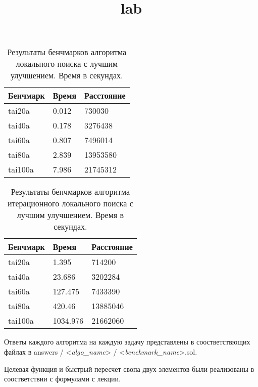 \documentclass{article}
\title{lab}
\author{}
\date{}
\begin{document}
\setlength{\parindent}{35pt}
\setlength{\footnotemargin}{5pt}
\sloppy
\frenchspacing %



\begin{table}[!h]
    \begin{center}
        \begin{tabular}{ | m{4.2em} | m{5em} | m{5em} |}
            \hline
            Бенчмарк & Время & Расстояние \\
            \hline
            tai20a   & 0.012 & 730030     \\
            \hline
            tai40a   & 0.178 & 3276438    \\
            \hline
            tai60a   & 0.807 & 7496014    \\
            \hline
            tai80a   & 2.839 & 13953580   \\
            \hline
            tai100a  & 7.986 & 21745312   \\
            \hline
        \end{tabular}
        \caption{Результаты бенчмарков алгоритма локального поиска с лучшим улучшением. Время в секундах.}
    \end{center}
\end{table}

\begin{table}[!h]
    \begin{center}
        \begin{tabular}{ | m{4.2em} | m{5em} | m{5em} |}
            \hline
            Бенчмарк & Время    & Расстояние \\
            \hline
            tai20a   & 1.395    & 714200     \\
            \hline
            tai40a   & 23.686   & 3202284    \\
            \hline
            tai60a   & 127.475  & 7433390    \\
            \hline
            tai80a   & 420.46   & 13885046   \\
            \hline
            tai100a  & 1034.976 & 21662060   \\
            \hline
        \end{tabular}
        \caption{Результаты бенчмарков алгоритма итерационного локального поиска с лучшим улучшением. Время в секундах.}
    \end{center}
\end{table}

Ответы каждого алгоритма на каждую задачу представлены в соостветствющих файлах в
answers / <\textit{algo\_name}> / <\textit{benchmark\_name}>.sol.

Целевая функция и быстрый пересчет свопа двух элементов были реализованы в соостветствии с формулами с лекции.
\end{document}

